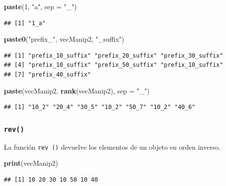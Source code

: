 \documentclass[]{book}
\newenvironment{Shaded}{\begin{snugshade}}{\end{snugshade}}
\newcommand{\KeywordTok}[1]{\textcolor[rgb]{0.13,0.29,0.53}{\textbf{#1}}}
\newcommand{\DataTypeTok}[1]{\textcolor[rgb]{0.13,0.29,0.53}{#1}}
\newcommand{\DecValTok}[1]{\textcolor[rgb]{0.00,0.00,0.81}{#1}}
\newcommand{\StringTok}[1]{\textcolor[rgb]{0.31,0.60,0.02}{#1}}
\newcommand{\NormalTok}[1]{#1}
\begin{document}
\begin{Shaded}
\begin{Highlighting}[]
\KeywordTok{paste}\NormalTok{(}\DecValTok{1}\NormalTok{, }\StringTok{"a"}\NormalTok{, }\DataTypeTok{sep =} \StringTok{"_"}\NormalTok{)}
\end{Highlighting}
\end{Shaded}

\begin{verbatim}
## [1] "1_a"
\end{verbatim}

\begin{Shaded}
\begin{Highlighting}[]
\KeywordTok{paste0}\NormalTok{(}\StringTok{"prefix_"}\NormalTok{, vecManip2, }\StringTok{"_suffix"}\NormalTok{)}
\end{Highlighting}
\end{Shaded}

\begin{verbatim}
## [1] "prefix_10_suffix" "prefix_20_suffix" "prefix_30_suffix"
## [4] "prefix_10_suffix" "prefix_50_suffix" "prefix_10_suffix"
## [7] "prefix_40_suffix"
\end{verbatim}

\begin{Shaded}
\begin{Highlighting}[]
\KeywordTok{paste}\NormalTok{(vecManip2, }\KeywordTok{rank}\NormalTok{(vecManip2), }\DataTypeTok{sep =} \StringTok{"_"}\NormalTok{)}
\end{Highlighting}
\end{Shaded}

\begin{verbatim}
## [1] "10_2" "20_4" "30_5" "10_2" "50_7" "10_2" "40_6"
\end{verbatim}

\subsubsection{\texorpdfstring{\texttt{rev()}}{rev()}}\label{l015rev}

La función \texttt{rev\ ()} devuelve los elementos de un objeto en orden
inverso.

\begin{Shaded}
\begin{Highlighting}[]
\KeywordTok{print}\NormalTok{(vecManip2)}
\end{Highlighting}
\end{Shaded}

\begin{verbatim}
## [1] 10 20 30 10 50 10 40
\end{verbatim}
\end{document}
